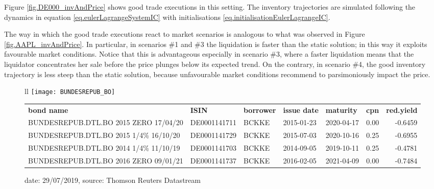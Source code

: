 \documentclass[10pt,a4paper]{article}
\begin{document}
Figure \ref{fig.DE000_invAndPrice} shows good trade executions in this setting. The inventory trajectories are simulated following the dynamics in equation \eqref{eq.eulerLagrangeSystemIC} with initialisations \eqref{eq.initialisationEulerLagrangeIC}.

The way in which the good trade executions react to market scenarios is analogous to what was observed in Figure \ref{fig.AAPL_invAndPrice}. In particular, in scenarios \#1 and \#3 the liquidation is faster than the static solution; in this way it exploits favourable market conditions. Notice that this is advantageous especially in scenario \#3, where a faster liquidation means that the liquidator concentrates her sale before the price plunges below its expected trend. On the contrary, in scenario \#4, the good inventory trajectory is less steep than the static solution, because unfavourable market conditions recommend to parsimoniously impact the price.  



\begin{center}
\begin{figure}
\centering
\begin{tabular}{ll}
\texttt{[image: BUNDESREPUB\_BO]}
\\
\begin{tiny}
\begin{tabular}{lllllrr}

	  \textbf{bond name} &          \textbf{ISIN} & \textbf{borrower} & \textbf{issue date} & \textbf{maturity} &  \textbf{cpn} &  \textbf{red.yield}  \\

    	BUNDESREPUB.DTL.BO 2015 ZERO 17/04/20  &  DE0001141711 &         BCKKE & 2015-01-23 &           2020-04-17 &    0.00 &           -0.6459  \\
     	BUNDESREPUB.DTL.BO 2015 1/4\% 16/10/20  &  DE0001141729 &         BCKKE & 2015-07-03 &           2020-10-16 &    0.25 &           -0.6955  \\ 
      	BUNDESREPUB.DTL.BO 2014 1/4\% 11/10/19  &  DE0001141703 &         BCKKE & 2014-09-05 &           2019-10-11 &    0.25 &           -0.4781  \\ 
       	BUNDESREPUB.DTL.BO 2016 ZERO 09/01/21 &  DE0001141737 &         BCKKE & 2016-02-05 &           2021-04-09 &    0.00 &           -0.7484  \\
	
\end{tabular}
\end{tiny}
\end{tabular}
\caption{{date: 29/07/2019, source: Thomson Reuters Datastream}}
\label{fig.historicalBundPrices}
\end{figure}	
\end{center}
\end{document}

